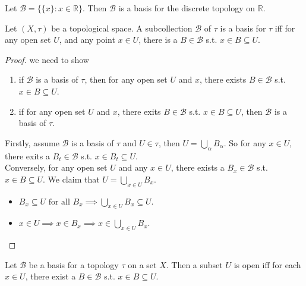 \begin{example}
    Let $\mathcal{B} = \{\{x\}: x \in \mathbb{R}\}$.
    Then $\mathcal{B}$ is a basis for the discrete topology on $\mathbb{R}$.
\end{example}

\begin{proposition}{}{}
    Let $(X,\tau)$ be a topological space. A subcollection $\mathcal{B}$ of
    $\tau$ is a basis for $\tau$ iff
    for any open set $U$, and any point $x \in U$, there is a $B \in
    \mathcal{B}$ s.t. $x \in B \subseteq U$.
\end{proposition}

\begin{proof}
    we need to show
    \begin{enumerate}

        \item if $\mathcal{B}$ is a basis of $\tau$, then for any
            open set $U$ and $x$, there exists $B \in \mathcal{B}$
            s.t. $x \in B \subseteq U$.
        \item if for any open set $U$ and $x$, there exits $B \in
            \mathcal{B}$ s.t. $x \in B \subseteq U$, then
            $\mathcal{B}$ is a basis of $\tau$.

    \end{enumerate}
    Firstly, assume $\mathcal{B}$ is a basis of $\tau$ and $U \in
    \tau$, then $U = \bigcup_{\alpha} B_{\alpha}$. So for any $x \in
    U$, there exits a $B_{t} \in \mathcal{B}$ s.t. $x \in B_{t} \subseteq U$.\\
    Conversely, for any open set $U$ and any $x \in U$,
    there exists a $B_{x} \in \mathcal{B}$ s.t. $x \in B \subseteq
    U$. We claim that $U = \bigcup_{x \in U} B_{x}$.
    \begin{itemize}
        \item $B_{x} \subseteq U \text{ for all } B_{x} \implies
            \bigcup_{x \in U} B_{x} \subseteq U$.
        \item $x \in U \implies x \in B_{x} \implies x \in \bigcup_{x
            \in U} B_{x}$.
    \end{itemize}
\end{proof}

\begin{proposition}{}{}
    Let $\mathcal{B}$ be a basis for a topology $\tau$ on a set $X$.
    Then a subset $U$ is open iff for each $x \in U$, there exist a
    $B \in \mathcal{B}$ s.t. $x \in B \subseteq U$.
\end{proposition}


